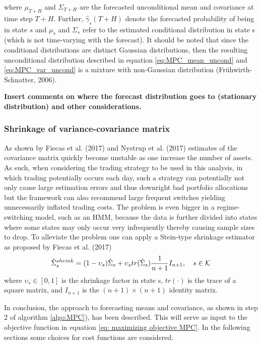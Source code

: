 where $\mu_{T+H}$ and $\Sigma_{T+H}$ are the forecasted unconditional mean and covariance at time step $T+H$. Further, $\hat\gamma_s(T+H)$ denote the forecasted probability of being in state $s$ and $\mu_s$ and $\Sigma_s$ refer to the estimated conditional distribution in state s (which is not time-varying with the forecast). It should be noted that since the conditional distributions are distinct Gaussian distributions, then the resulting unconditional distribution described in equation \ref{eq:MPC_mean_uncond} and \ref{eq:MPC_var_uncond} is a mixture with non-Gaussian distribution (Frühwirth-Schnatter, 2006).


\textbf{Insert comments on where the forecast distribution goes to (stationary distribution) and other considerations.}

\subsubsection{Shrinkage of variance-covariance matrix}

As shown by Fiecas et al. (2017) and Nystrup et al. (2017) estimates of the covariance matrix quickly become unstable as one increase the number of assets. As such, when considering the trading strategy to be used in this analysis, in which trading potentially occurs each day, such a strategy can potentially not only cause large estimation errors and thus downright bad portfolio allocations but the framework can also recommend large frequent switches yielding unnecessarily inflated trading costs. The problem is even bigger in a regime-switching model, such as an HMM, because the data is further divided into states where some states may only occur very infrequently thereby causing sample sizes to drop. To alleviate the problem one can apply a Stein-type shrinkage estimator as proposed by Fiecas et al. (2017)
\begin{equation}
    \hat\Sigma_s^{shrink} = (1-\upsilon_s)\hat\Sigma_s + \upsilon_s tr(\hat\Sigma_s) \frac{1}{n+1} I_{n+1},
    \quad s \in\operatorname{\mathcal{K}}
\end{equation}
where $\upsilon_s\in[0,1]$ is the shrinkage factor in state s, $tr(\cdot)$ is the trace of a square matrix, and $I_{n+1}$ is the $(n+1)\times (n+1)$ identity matrix.

In conclusion, the approach to forecasting means and covariance, as shown in step 2 of algorithm \ref{algo:MPC}), has been described. This will serve as input to the objective function in equation \ref{eq: maximizing objective MPC}. In the following sections some choices for cost functions are considered.

